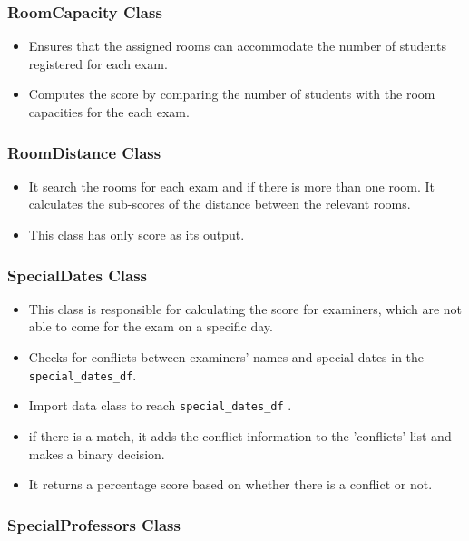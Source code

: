 \subsubsection{RoomCapacity Class}


\begin{itemize}
\item Ensures that the assigned rooms can accommodate the number of students registered for each exam.
\item Computes the score by comparing the number of students with the room capacities for the each exam.
\end{itemize}

\subsubsection{RoomDistance Class}


\begin{itemize}
\item It search the rooms for each exam and if there is more than one room. It calculates the sub-scores of the distance between the relevant rooms.
\item This class has only score as its output.
\end{itemize}

\subsubsection{SpecialDates Class}


\begin{itemize}
\item This class is responsible for calculating the score for examiners, which are not able to come for the exam on a specific day.
\item Checks for conflicts between examiners' names and special dates in the \verb|special_dates_df|.
\item Import data class to reach \verb|special_dates_df| .
\item if there is a match, it adds the conflict information to the 'conflicts' list and makes a binary decision.
\item It returns a percentage score based on whether there is a conflict or not.
\end{itemize}

\subsubsection{SpecialProfessors Class}



